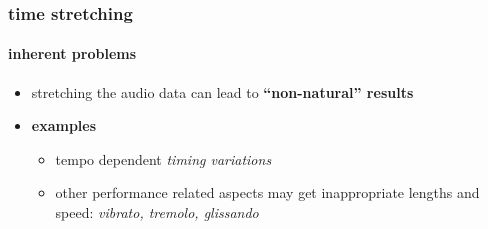 \begin{frame}\frametitle{time stretching}\framesubtitle{inherent problems}
	\begin{itemize}
		\item	stretching the audio data can lead to \textbf{``non-natural'' results}
		\pause
        \bigskip
		\item	\textbf{examples}
			\begin{itemize}
				\item tempo dependent \textit{timing variations }
				\pause
				\item	other performance related aspects may get inappropriate lengths and speed: \textit{vibrato, tremolo, glissando}
			\end{itemize}
	\end{itemize}
\end{frame}

